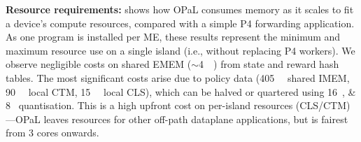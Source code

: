 \documentclass[
conference
,10pt
]{IEEEtran}
\newcommand{\fakepara}[1]{\noindent\textbf{#1:}}
\newcommand{\approachshort}{OPaL}
\newcommand{\Coopfw}{\emph{CoOp}}
\newcommand{\Indfw}{\emph{Ind}}
\begin{document}
\fakepara{Resource requirements}
 shows how \approachshort{} consumes memory as it scales to fit a device's compute resources, compared with a simple P4 forwarding application.
As one program is installed per ME, these results represent the minimum and maximum resource use on a single island (i.e., without replacing P4 workers).
We observe negligible costs on shared EMEM ($\sim$\SI{4}{\mebi\byte}) from state and reward hash tables.
The most significant costs arise due to policy data (\SI{405}{\kibi\byte} shared IMEM, \SI{90}{\kibi\byte} local CTM, \SI{15}{\kibi\byte} local CLS), which can be halved or quartered using \SIlist{16;8}{\bit} quantisation.
This is a high upfront cost on per-island resources (CLS/CTM)---\approachshort{} leaves resources for other off-path dataplane applications, but is fairest from 3 cores onwards.

\end{document}
